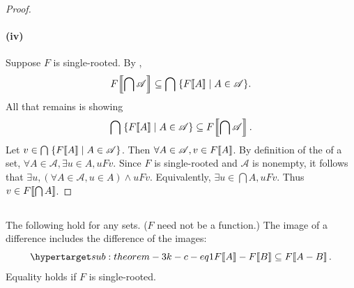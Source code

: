 \documentclass{report}
\begin{document}
\begin{proof}
  \paragraph{(iv)}%

    Suppose $F$ is single-rooted.
    By ,
      $$F\!\left\llbracket\bigcap\mathscr{A}\right\rrbracket \subseteq
        \bigcap\;\{F\!\left\llbracket A\right\rrbracket \mid A \in \mathscr{A}\}.$$
    All that remains is showing
      $$\bigcap\;\{F\!\left\llbracket A\right\rrbracket \mid A \in \mathscr{A}\} \subseteq
        F\!\left\llbracket\bigcap\mathscr{A}\right\rrbracket.$$
    Let $v \in \bigcap\;\{F\!\left\llbracket A\right\rrbracket \mid A \in \mathscr{A}\}$.
    Then $\forall A \in \mathscr{A}, v \in F\!\left\llbracket A\right\rrbracket$.
    By definition of the  of a set,
      $\forall A \in \mathscr{A}, \exists u \in A, uFv$.
    Since $F$ is single-rooted and $\mathscr{A}$ is nonempty, it follows that
      $\exists u, (\forall A \in \mathscr{A}, u \in A) \land uFv$.
    Equivalently, $\exists u \in \bigcap{A}, uFv$.
    Thus $v \in F\!\left\llbracket\bigcap{A}\right\rrbracket$.

\end{proof}

\subsection{}%

\begin{theorem}[3K(c)]

  The following hold for any sets. ($F$ need not be a function.)
  The image of a difference includes the difference of the images:
    \begin{equation}
      \hyperlabel{sub:theorem-3k-c-eq1}
      \img{F}{A} - \img{F}{B} \subseteq \img{F}{A - B}.
    \end{equation}
  Equality holds if $F$ is single-rooted.

\end{theorem}
\end{document}
